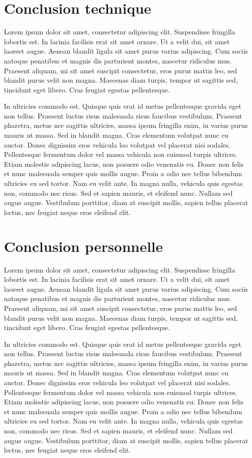 \documentclass[a4paper,12pt]{report}
\begin{document}
\section*{Conclusion technique}
Lorem ipsum dolor sit amet, consectetur adipiscing elit. Suspendisse
fringilla lobortis est. In lacinia facilisis erat sit amet ornare. Ut
a velit dui, sit amet laoreet augue. Aenean blandit ligula sit amet
purus varius adipiscing. Cum sociis natoque penatibus et magnis dis
parturient montes, nascetur ridiculus mus. Praesent aliquam, mi sit
amet suscipit consectetur, eros purus mattis leo, sed blandit purus
velit non magna. Maecenas diam turpis, tempor ut sagittis sed,
tincidunt eget libero. Cras feugiat egestas pellentesque.

In ultricies commodo est. Quisque quis erat id metus pellentesque
gravida eget non tellus. Praesent luctus risus malesuada risus
faucibus vestibulum. Praesent pharetra, metus nec sagittis ultricies,
massa ipsum fringilla enim, in varius purus mauris ut massa. Sed in
blandit magna. Cras elementum volutpat nunc eu auctor. Donec dignissim
eros vehicula leo volutpat vel placerat nisi sodales. Pellentesque
fermentum dolor vel massa vehicula non euismod turpis ultrices. Etiam
molestie adipiscing lacus, non posuere odio venenatis eu. Donec non
felis et nunc malesuada semper quis mollis augue. Proin a odio nec
tellus bibendum ultricies eu sed tortor. Nam eu velit ante. In magna
nulla, vehicula quis egestas non, commodo nec risus. Sed et sapien
mauris, et eleifend nunc. Nullam sed augue augue. Vestibulum
porttitor, diam at suscipit mollis, sapien tellus placerat lectus, nec
feugiat neque eros eleifend elit.

\section*{Conclusion personnelle}
Lorem ipsum dolor sit amet, consectetur adipiscing elit. Suspendisse
fringilla lobortis est. In lacinia facilisis erat sit amet ornare. Ut
a velit dui, sit amet laoreet augue. Aenean blandit ligula sit amet
purus varius adipiscing. Cum sociis natoque penatibus et magnis dis
parturient montes, nascetur ridiculus mus. Praesent aliquam, mi sit
amet suscipit consectetur, eros purus mattis leo, sed blandit purus
velit non magna. Maecenas diam turpis, tempor ut sagittis sed,
tincidunt eget libero. Cras feugiat egestas pellentesque.

In ultricies commodo est. Quisque quis erat id metus pellentesque
gravida eget non tellus. Praesent luctus risus malesuada risus
faucibus vestibulum. Praesent pharetra, metus nec sagittis ultricies,
massa ipsum fringilla enim, in varius purus mauris ut massa. Sed in
blandit magna. Cras elementum volutpat nunc eu auctor. Donec dignissim
eros vehicula leo volutpat vel placerat nisi sodales. Pellentesque
fermentum dolor vel massa vehicula non euismod turpis ultrices. Etiam
molestie adipiscing lacus, non posuere odio venenatis eu. Donec non
felis et nunc malesuada semper quis mollis augue. Proin a odio nec
tellus bibendum ultricies eu sed tortor. Nam eu velit ante. In magna
nulla, vehicula quis egestas non, commodo nec risus. Sed et sapien
mauris, et eleifend nunc. Nullam sed augue augue. Vestibulum
porttitor, diam at suscipit mollis, sapien tellus placerat lectus, nec
feugiat neque eros eleifend elit.
\end{document}
